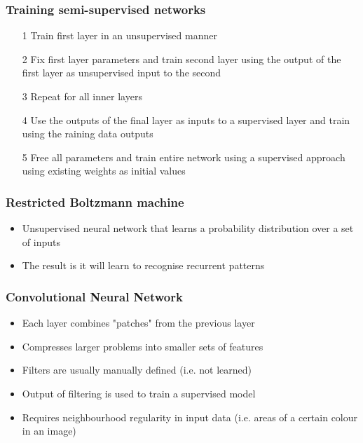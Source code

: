 \documentclass[a4paper]{article}
\begin{document}
\subsubsection{Training semi-supervised networks}

\begin{enumerate}
  \item[1] Train first layer in an unsupervised manner
  \item[2] Fix first layer parameters and train second layer using the output of
           the first layer as unsupervised input to the second
  \item[3] Repeat for all inner layers
  \item[4] Use the outputs of the final layer as inputs to a supervised layer
           and train using the raining data outputs
  \item[5] Free all parameters and train entire network using a supervised
           approach using existing weights as initial values
\end{enumerate}

\subsubsection{Restricted Boltzmann machine}

\begin{itemize}
  \item Unsupervised neural network that learns a probability distribution over
        a set of inputs
  \item The result is it will learn to recognise recurrent patterns
\end{itemize}

\subsubsection{Convolutional Neural Network}

\begin{itemize}
  \item Each layer combines "patches" from the previous layer
  \item Compresses larger problems into smaller sets of features
  \item Filters are usually manually defined (i.e. not learned)
  \item Output of filtering is used to train a supervised model
  \item Requires neighbourhood regularity in input data (i.e. areas of a certain
        colour in an image)
\end{itemize}
\end{document}
